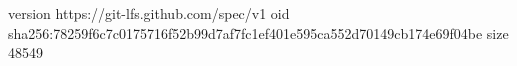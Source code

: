 version https://git-lfs.github.com/spec/v1
oid sha256:78259f6c7c0175716f52b99d7af7fc1ef401e595ca552d70149cb174e69f04be
size 48549
